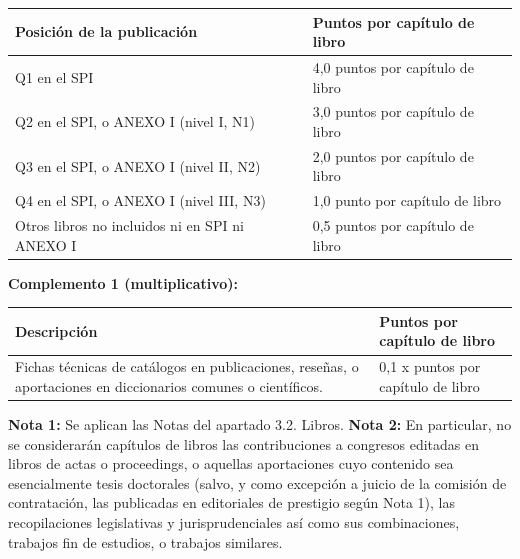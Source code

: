 \documentclass{article}
\begin{document}
\begin{itemize}
\begin{itemize}
\begin{scriptsize}
                  \vspace{0.4cm}
                  \begin{table}[h!]\centering\renewcommand{\arraystretch}{1.3}
                    \begin{tabular}{|p{}|p{}|}\hline
                      Posición de la publicación                     & Puntos por capítulo de libro     \\\hline
                      Q1 en el SPI                                   & 4,0 puntos por capítulo de libro \\\hline
                      Q2 en el SPI, o ANEXO I (nivel I, N1)          & 3,0 puntos por capítulo de libro \\\hline
                      Q3 en el SPI, o ANEXO I (nivel II, N2)         & 2,0 puntos por capítulo de libro \\\hline
                      Q4 en el SPI, o ANEXO I (nivel III, N3)        & 1,0 punto por capítulo de libro  \\\hline
                      Otros libros no incluidos ni en SPI ni ANEXO I & 0,5 puntos por capítulo de libro \\\hline
                    \end{tabular}\end{table}
                  \vspace{0.4cm}

                  \textbf{Complemento 1 (multiplicativo):}

                  \vspace{0.4cm}
                  \begin{table}[h!]\centering\renewcommand{\arraystretch}{1.3}
                    \begin{tabular}{|p{}|p{}|}\hline
                      Descripción                                                                                                   & Puntos por capítulo de libro       \\\hline
                      Fichas técnicas de catálogos en publicaciones, reseñas, o aportaciones en diccionarios comunes o científicos. & 0,1 x puntos por capítulo de libro \\\hline
                    \end{tabular}\end{table}
                  \vspace{0.4cm}

                  \textbf{Nota 1:} Se aplican las Notas del apartado 3.2. Libros.
                  \textbf{Nota 2:} En particular, no se considerarán capítulos de libros las contribuciones a congresos editadas en libros de actas o proceedings, o aquellas aportaciones cuyo contenido sea esencialmente tesis doctorales (salvo, y como excepción a juicio de la comisión de contratación, las publicadas en editoriales de prestigio según Nota 1), las recopilaciones legislativas y jurisprudenciales así como sus combinaciones, trabajos fin de estudios, o trabajos similares.


\end{scriptsize}
\end{itemize}
\end{itemize}
\end{document}
